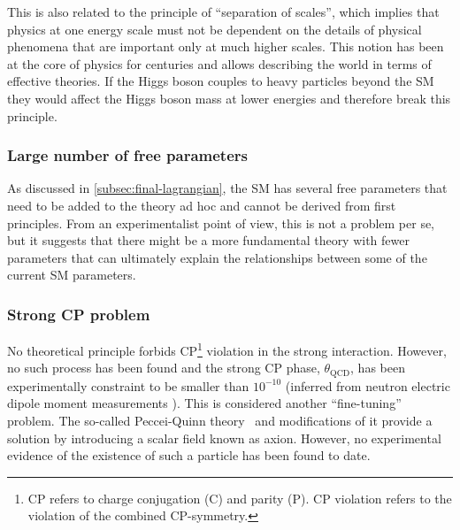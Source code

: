 This is also related to the principle of ``separation of scales'', which implies that physics at one energy scale must not be dependent on the details of physical phenomena that are important only at much higher scales.
This notion has been at the core of physics for centuries and allows describing the world in terms of effective theories. 
If the Higgs boson couples to heavy particles beyond the SM they would affect the Higgs boson mass at lower energies and therefore break this principle.

\subsubsection{Large number of free parameters}
As discussed in \cref{subsec:final-lagrangian}, the SM has several free parameters that need to be added to the theory ad hoc and cannot be derived from first principles. 
From an experimentalist point of view, this is not a problem per se, but it suggests that there might be a more fundamental theory with fewer parameters that can ultimately explain the relationships between some of the current SM parameters.


\subsubsection{Strong CP problem}
No theoretical principle forbids CP\footnote{CP refers to charge conjugation (C) and parity (P). CP violation refers to the violation of the combined CP-symmetry.} violation in the strong interaction. However, no such process has been found and the strong CP phase, $\theta_{\text{QCD}}$, has been experimentally constraint to be smaller than $10^{-10}$ (inferred from neutron electric dipole moment measurements \cite{Baker_2006}). This is considered another ``fine-tuning'' problem.
The so-called Peccei-Quinn theory~\cite{PhysRevLett.38.1440} and modifications of it provide a solution by introducing a scalar field known as axion. However, no experimental evidence of the existence of such a particle has been found to date.

